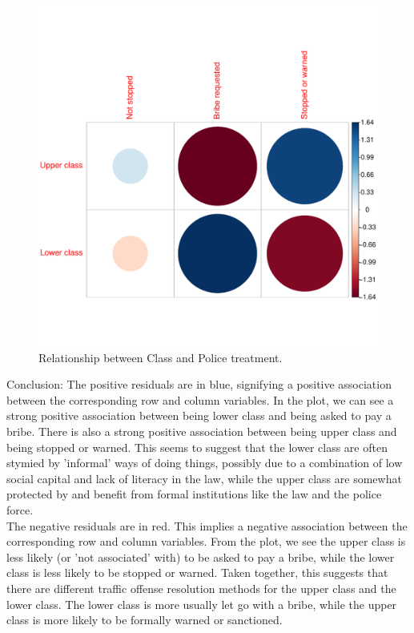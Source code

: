 \documentclass[12pt,letterpaper]{article}
\begin{document}
\begin{enumerate}
\vspace{.5cm}
  
\vspace{.5cm}
\begin{figure}[hbtp!]\centering
	\caption{\footnotesize Relationship between Class and Police treatment.}
	\label{fig:plot_1}
	\includegraphics[width=.75\textwidth]{corrplot_class_treatment.pdf}
\end{figure}
\noindent Conclusion: The positive residuals are in blue, signifying a positive association between the corresponding row and column variables. In the plot, we can see a strong positive association between being lower class and being asked to pay a bribe. There is also a strong positive association between being upper class and being stopped or warned. This seems to suggest that the lower class are often stymied by 'informal' ways of doing things, possibly due to a combination of low social capital and lack of literacy in the law, while the upper class are somewhat protected by and benefit from formal institutions like the law and the police force.\\
\noindent The negative residuals are in red. This implies a negative association between the corresponding row and column variables. From the plot, we see the upper class  is less likely (or 'not associated' with) to be asked to pay a bribe, while the  lower class is less likely to be stopped or warned. Taken together, this suggests that there are different traffic offense resolution methods for the upper class and the lower class. The lower class is more usually let go with a bribe, while the upper class is more likely to be formally warned or sanctioned.\\
	
\end{enumerate}
\newpage
\end{document}
